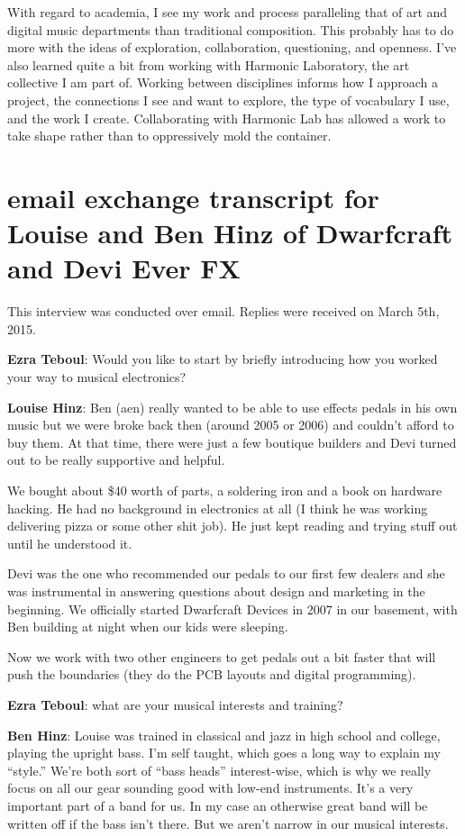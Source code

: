 With regard to academia, I see my work and process paralleling that of art and digital
music departments than traditional composition. This probably has to do more with the
ideas of exploration, collaboration, questioning, and openness. I've also learned quite
a bit from working with Harmonic Laboratory, the art collective I am part of. Working
between disciplines informs how I approach a project, the connections I see and want to
explore, the type of vocabulary I use, and the work I create. Collaborating with
Harmonic Lab has allowed a work to take shape rather than to oppressively mold the
container.

\section{email exchange transcript for Louise and Ben Hinz of Dwarfcraft and Devi Ever FX}

This interview was conducted over email. Replies were received on March 5th, 2015. 

\textbf{Ezra Teboul}: Would you like to start by briefly introducing how you worked your way to musical electronics?

\textbf{Louise Hinz}: Ben (aen) really wanted to be
able to use effects pedals in his own music but we were broke back
then (around 2005 or 2006) and couldn't afford to buy them.  At that
time, there were just a few boutique builders and Devi turned out to
be really supportive and helpful.

We bought about \$40 worth of parts, a soldering iron and a book on
hardware hacking.  He had no background in electronics at all (I think
he was working delivering pizza or some other shit job).  He just kept
reading and trying stuff out until he understood it.

Devi was the one who recommended our pedals to our first few dealers
and she was instrumental in answering questions about design and
marketing in the beginning.  We officially started Dwarfcraft Devices
in 2007 in our basement, with Ben building at night when our kids were
sleeping.

Now we work with two other engineers to get pedals out a bit faster
that will push the boundaries (they do the PCB layouts and digital
programming).

\textbf{Ezra Teboul}: what are your musical interests and training? 

\textbf{Ben Hinz}: Louise was trained in classical and jazz in high school and college, playing
the upright bass. I'm self taught, which goes a long way to explain my ``style.'' 
We're both sort of ``bass heads'' interest-wise, which is why we really focus on all 
our gear sounding good with low-end instruments. It's a very important part of a 
band for us. In my case an otherwise great band will be written off if the bass isn’t 
there. But we aren’t narrow in our musical interests.


